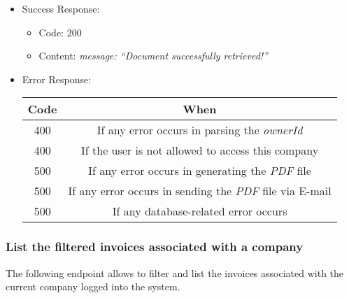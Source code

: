 \begin{itemize}
    \item Success Response:
    \begin{itemize}
        \item Code: 200
        \item Content:
        \textit{
{
    message: “Document successfully retrieved!”
}
        }
    \end{itemize}

    \item Error Response:
    \begin{table}[!h]
    \centering
    \begin{tabular}{|c|c|}
    \hline
    \multicolumn{1}{|c|}{\textbf{Code}} & \multicolumn{1}{c|}{\textbf{When}} \\ \hline
    400 & If any error occurs in parsing the \textit{ownerId}  \\\hline
    400 & If the user is not allowed to access this company \\\hline
    500 & If any error occurs in generating the \textit{PDF} file \\\hline
    500 & If any error occurs in sending the \textit{PDF} file via E-mail\\\hline
    500 & If any database-related error occurs \\\hline
    \end{tabular}
    \end{table}

\end{itemize}



\newpage
\subsubsection*{List the filtered invoices associated with a company}

The following endpoint allows to filter and list the invoices associated with the current company logged into the system.

